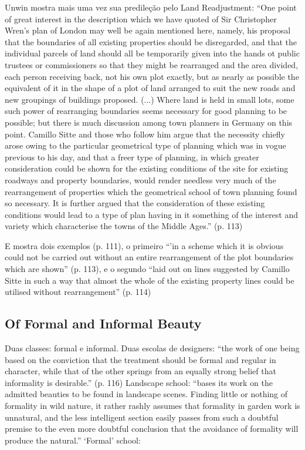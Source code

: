 \documentclass[12pt, a4paper]{book} %
\begin{document}
        Unwin mostra mais uma vez sua predileção pelo Land Readjustment: ``One point of great interest in the description which we have quoted of Sir Christopher Wren's plan of London may well be again mentioned here, namely, his proposal that the boundaries of all existing properties should be disregarded, and that the individual parcels of land should all be temporarily given into the hands ot public trustees or commissioners so that they might be rearranged and the area divided, each person receiving back, not his own plot exactly, but as nearly as possible the equivalent of it in the shape of a plot of land arranged to suit the new roads and new groupings of buildings proposed. (...) Where land is held in small lots, some such power of rearranging boundaries seems necessary for good planning to be possible; but there is much discussion among town planners in Germany on this point. Camillo Sitte and those who follow him argue that the necessity chiefly arose owing to the particular geometrical type of planning which was in vogue previous to his day, and that a freer type of planning, in which greater consideration could be shown for the existing conditions of the site for existing roadways and property boundaries, would render needless very much of the rearrangement of properties which the geometrical school of town planning found so necessary. It is further argued that the consideration of these existing conditions would lead to a type of plan having in it something of the interest and variety which characterise the towns of the Middle Ages.'' (p. 113)

        E mostra dois exemplos (p. 111), o primeiro ``'in a scheme which it is obvious could not be carried out without an entire rearrangement of the plot boundaries which are shown'' (p. 113), e o segundo ``laid out on lines suggested by Camillo Sitte in such a way that almost the whole of the existing property lines could be utilised without rearrangement'' (p. 114)

        \subsection*{Of Formal and Informal Beauty}

        Duas classes: formal e informal.
        Duas escolas de designers: ``the work of one being based on the conviction that the treatment should be formal and regular in character, while that of the other springs from an equally strong belief that informality is desirable.'' (p. 116)
        Landscape school: ``bases its work on the admitted beauties to be found in landscape scenes. Finding little or nothing of formality in wild nature, it rather rashly assumes that formality in garden work is unnatural, and the less intelligent section easily passes from such a doubtful premise to the even more doubtful conclusion that the avoidance of formality will produce the natural.''
        `Formal' school:
\end{document}
